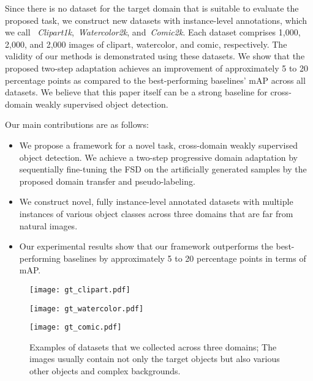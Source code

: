 \documentclass[10pt,twocolumn,letterpaper]{article}
\newcommand{\datasetclipart}{Clipart1k}
\newcommand{\datasetwatercolor}{Watercolor2k}
\newcommand{\datasetcomic}{Comic2k}
\begin{document}
Since there is no dataset for the target domain that is suitable to evaluate the proposed task, we construct new datasets with instance-level annotations, which we call ~\textit{\datasetclipart},~\textit{\datasetwatercolor}, and~\textit{\datasetcomic}.
Each dataset comprises 1,000, 2,000, and 2,000 images of clipart, watercolor, and comic, respectively.
The validity of our methods is demonstrated using these datasets.
We show that the proposed two-step adaptation achieves an improvement of approximately 5 to 20 percentage points as compared to the best-performing baselines' mAP across all datasets.
We believe that this paper itself can be a strong baseline for cross-domain weakly supervised object detection.

Our main contributions are as follows:
\begin{itemize}[wide=0pt]
\setlength{\itemsep}{0cm}
    \item We propose a framework for a novel task, cross-domain weakly supervised object detection.
We achieve a two-step progressive domain adaptation by sequentially fine-tuning the FSD on the artificially generated samples by the proposed domain transfer and pseudo-labeling.
    \item We construct novel, fully instance-level annotated datasets with multiple instances of various object classes across three domains that are far from natural images.
    \item Our experimental results show that our framework outperforms the best-performing baselines by approximately 5 to 20 percentage points in terms of mAP.
\end{itemize}

\begin{figure*}[t]
	\begin{minipage}[t]{0.36\hsize}
		\centering
    	\texttt{[image: gt\_clipart.pdf]}
    	\vspace{-0.35cm}
		\subcaption{\datasetclipart}
		\label{fig:gt_clipart}
	\end{minipage}
	\hfill
	\begin{minipage}[t]{0.30\hsize}
		\centering
    	\texttt{[image: gt\_watercolor.pdf]}
    	\vspace{0.05cm}
		\subcaption{\datasetwatercolor}
		\label{fig:gt_watercolor}
	\end{minipage}
	\hfil
	\begin{minipage}[t]{0.3\hsize}
		\centering
    	\texttt{[image: gt\_comic.pdf]}
    	\vspace{-0.4cm}
		\subcaption{\datasetcomic}
		\label{fig:gt_comic}
	\end{minipage}
    \caption{Examples of datasets that we collected across three domains; The images usually contain not only the target objects but also various other objects and complex backgrounds.}
    \label{fig:dataset_images}
\end{figure*}
\end{document}

